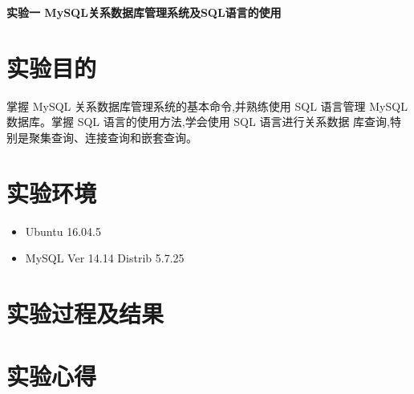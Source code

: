 \documentclass{ML}
\begin{document}
\maketitle

\newpage

\begin{center}
    \textbf{ 实验一 MySQL关系数据库管理系统及SQL语言的使用}
\end{center}

\section{实验目的}
    掌握 MySQL 关系数据库管理系统的基本命令,并熟练使用 SQL 语言管理
MySQL 数据库。掌握 SQL 语言的使用方法,学会使用 SQL 语言进行关系数据
库查询,特别是聚集查询、连接查询和嵌套查询。
\section{实验环境}
\begin{itemize}
    \item Ubuntu 16.04.5
    \item MySQL Ver 14.14 Distrib 5.7.25
\end{itemize}
\section{实验过程及结果}

\section{实验心得}


\end{document}

